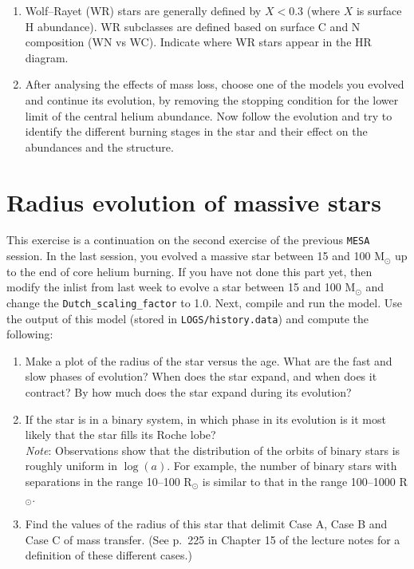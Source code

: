 \documentclass[11pt,a4paper]{article}
\begin{document}
\begin{enumerate}[label=(\alph*)]
\item Wolf–Rayet (WR) stars are generally defined by $X < 0.3$ (where $X$ is surface H abundance). WR subclasses are defined based on surface C and N composition (WN vs WC). Indicate where WR stars appear in the HR diagram.

\item After analysing the effects of mass loss, choose one of the models you evolved and continue its evolution, by removing the stopping condition for the lower limit of the central helium abundance. 
Now follow the evolution and try to identify the different burning stages in the star and their effect on the abundances and the structure. 

\end{enumerate}



\section{Radius evolution of massive stars}

This exercise is a continuation on the second exercise of the previous \texttt{MESA} session. In the last session, you evolved a massive star between 15 and 100 M$_\odot$ up to the end of core helium burning. If you have not done this part yet, then modify the inlist from last week to evolve a star between 15 and 100 M$_\odot$ and change the \verb|Dutch_scaling_factor| to 1.0. Next, compile and run the model. Use the output of this model (stored in \verb|LOGS/history.data|) and compute the following:

\begin{enumerate}
\item Make a plot of the radius of the star versus the age. What are the fast and slow phases of evolution? When does the star expand, and when does it contract? By how much does the star expand during its evolution?
\item If the star is in a binary system, in which phase in its evolution is it most likely that the star fills its Roche lobe?\\
\textit{Note}: Observations show that the distribution of the orbits of binary stars is roughly uniform in $\log(a)$. For example, the number of binary stars with separations in the range 10--100 R$_\odot$ is similar to that in the range 100--1000 R$_\odot$.
\item Find the values of the radius of this star that delimit Case A, Case B and Case C of mass transfer. (See p.\ 225 in Chapter 15 of the lecture notes for a definition of these different cases.)
\end{enumerate}
\end{document}
